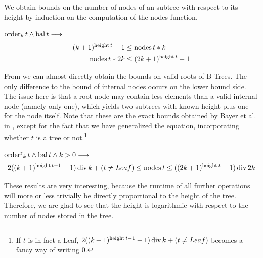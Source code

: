 
We obtain bounds
on the number of nodes of an subtree with respect to its height
by induction on the computation of the nodes function.

\begin{lemma}
    \label{lem:bound_internal_node}
    $\operatorname{order}_k t \wedge \operatorname{bal} t \longrightarrow$
    \begin{align}
        (k+1)^{\operatorname{height} t} - 1 &\le \operatorname{nodes} t * k \\
        \operatorname{nodes} t * 2k &\le (2k+1)^{\operatorname{height} t} - 1
    \end{align}
\end{lemma}

From  we can almost directly obtain
the bounds on valid roots of B-Trees.
The only difference to the bound of internal nodes occurs on the lower bound side.
The issue here is that a root node may contain less elements than
a valid internal node (namely only one), which yields two subtrees with known height
plus one for the node itself.
Note that these are the exact bounds obtained by Bayer et al. in \parencite{DBLP:journals/acta/BayerM72},
except for the fact that we have generalized the equation,
incorporating whether $t$ is a tree or not.\footnote{
    If $t$ is in fact a Leaf,
    $2((k+1)^{\operatorname{height} t - 1} - 1) \operatorname{div} k + (t \neq Leaf)$ becomes a fancy way of writing $0$.
}

\begin{theorem}
    $\operatorname{order^r}_k t \wedge \operatorname{bal} t \wedge k > 0 \longrightarrow$
    \begin{equation}
        2((k+1)^{\operatorname{height} t - 1} - 1) \operatorname{div} k + (t \neq Leaf) \le \operatorname{nodes} t \le ((2k+1)^{\operatorname{height} t} - 1) \operatorname{div} 2k
    \end{equation}
\end{theorem}

These results are very interesting, because
the runtime of all further operations will more or less trivially be
directly proportional to the height of the tree.
Therefore, we are glad to see that the height is logarithmic
with respect to the number of nodes stored in the tree.


